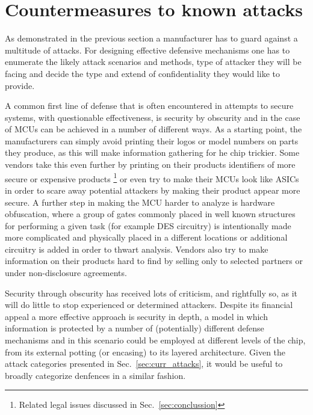 \section{Countermeasures to known attacks}
\label{sec:defenses}

As demonstrated in the previous section a manufacturer has to guard against a multitude of attacks. For designing effective defensive mechanisms one has to enumerate the likely attack scenarios and methods, type of attacker they will be facing and decide the type and extend of confidentiality they would like to provide\citep{sergei:thesis}.

A common first line of defense that is often encountered in attempts to secure systems, with questionable effectiveness, is security by obscurity and in the case of MCUs can be achieved in a number of different ways. As a starting point, the manufacturers can simply avoid printing their logos or model numbers on parts they produce, as this will make information gathering for he chip trickier. Some vendors take this even further by printing on their products identifiers of more secure or expensive products \footnote{Related legal issues discussed in Sec.~\ref{sec:conclussion}} or even try to make their MCUs look like ASICs  in order to scare away potential attackers by making their product appear more secure\citep{sergei:thesis}. A further step in making the MCU harder to analyze is hardware obfuscation, where a group of gates commonly placed in well known structures for performing a given task (for example DES circuitry) is intentionally made more complicated and physically placed in a different locations or additional circuitry is added in order to thwart analysis\citep{anderson:cautionary_note}. Vendors also try to make information on their products hard to find by selling only to selected partners or under non-disclosure agreements\citep{sergei:thesis}.

Security through obscurity has received lots of criticism, and rightfully so, as it will do little to stop experienced or determined attackers. Despite its financial appeal a more effective approach is security in depth, a model in which information is protected by a number of (potentially) different defense mechanisms and in this scenario could be employed at different levels of the chip, from its external potting (or encasing) to its layered architecture. Given the attack categories presented in Sec.~\ref{sec:curr_attacks}, it would be useful to broadly categorize denfences in a similar fashion.

